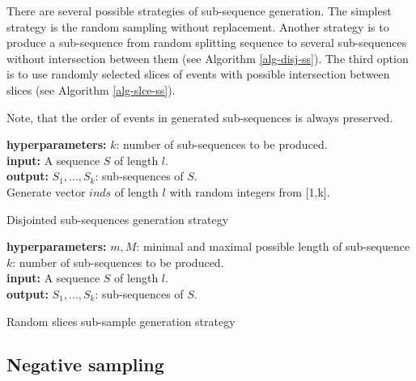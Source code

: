 \documentclass{article}
\begin{document}
There are several possible strategies of sub-sequence generation. The simplest strategy is the random sampling without replacement. Another strategy is to produce a sub-sequence from random splitting sequence to several sub-sequences without intersection between them (see Algorithm \ref{alg-disj-ss}). The third option is to use randomly selected slices of events with possible intersection between slices (see Algorithm \ref{alg-slce-ss}). 

Note, that the order of events in generated sub-sequences is always preserved.

\begin{algorithm}
\SetAlgoLined
\textbf{hyperparameters:} $k$: number of sub-sequences to be produced. \\
\textbf{input:} A sequence $S$ of length $l$. \\
\textbf{output:} $S_1,...,S_k$: sub-sequences of $S$. \\

\BlankLine
Generate vector $inds$ of length $l$ with random integers from [1,k].\\
\caption{Disjointed sub-sequences generation strategy}
\label{alg-disj-ss}

\end{algorithm}

\begin{algorithm}
\SetAlgoLined
\textbf{hyperparameters:} $m, M$: minimal and maximal possible length of sub-sequence\\ $k$: number of sub-sequences to be produced. \\
\textbf{input:} A sequence $S$ of length $l$. \\
\textbf{output:} $S_1,...,S_k$: sub-sequences of $S$. \\

\BlankLine
 
\caption{Random slices sub-sample generation strategy}
\label{alg-slce-ss}
\end{algorithm}


\subsection{Negative sampling} \label{sec-neg-samples}
\end{document}
